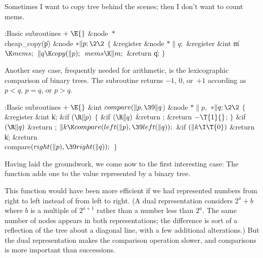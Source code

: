 Sometimes I want to copy tree behind the scenes; then I don't want to
count mems.

\Y\B\4:Basic subroutines\X${}\mathrel+\E{}$\6
\&{node} ${}{*}{}$\\{cheap\_copy}(\|p)\1\1\6
\&{node} ${}{*}\|p;\2\2{}$\6
${}\{{}$\1\6
\&{register} \&{node} ${}{*}\|q;{}$\6
\&{register} \&{int} \|m${}\K\\{mems};{}$\7
${}\|q\K\\{copy}(\|p);{}$\6
${}\\{mems}\K\|m;{}$\6
\&{return} \|q;\6
\4${}\}{}$\2\par
\fi

Another easy case, frequently needed for arithmetic, is the
lexicographic comparison of binary trees. The  subroutine
returns $-1$, $0$, or~$+1$ according as $p<q$, $p=q$, or $p>q$.

\Y\B\4:Basic subroutines\X${}\mathrel+\E{}$\6
\&{int} ${}\\{compare}(\|p,\39\|q{}$)\1%
\1\6
\&{node} ${}{*}\|p,{}$ ${}{*}\|q;\2\2{}$\6
${}\{{}$\1\6
\&{register} \&{int} \|k;\7
\&{if} ${}(\R\|p){}$\5
${}\{{}$\1\6
\&{if} ${}(\R\|q){}$\1\5
\&{return} ;\2\6
\&{return} ${}{-}\T{1}{}$;\6
\4${}\}{}$\2\6
\&{if} ${}(\R\|q){}$\1\5
\&{return} ;\2\6
${}\|k\K\\{compare}(\\{left}(\|p),\39\\{left}(\|q));{}$\6
\&{if} ${}(\|k\I\T{0}){}$\1\5
\&{return} \|k;\2\6
\&{return} \\{compare}${}(\\{right}(\|p),\39\\{right}(\|q));{}$\6
\4${}\}{}$\2\par
\fi

Having laid the groundwork, we come now to the first interesting case:
The  function adds one to the value represented by a binary tree.

This function would have been more efficient if we had represented
numbers from right to left instead of from left to right. (A dual
representation considers $2^a+b$ where $b$ is a multiple of $2^{a+1}$
rather than a number less than $2^a$. The same number of nodes appears
in both representations; the difference is sort of a reflection
of the tree about a diagonal line, with a few additional alterations.)
But the dual representation makes the comparison operation slower, and
comparisons is more important than successions.


